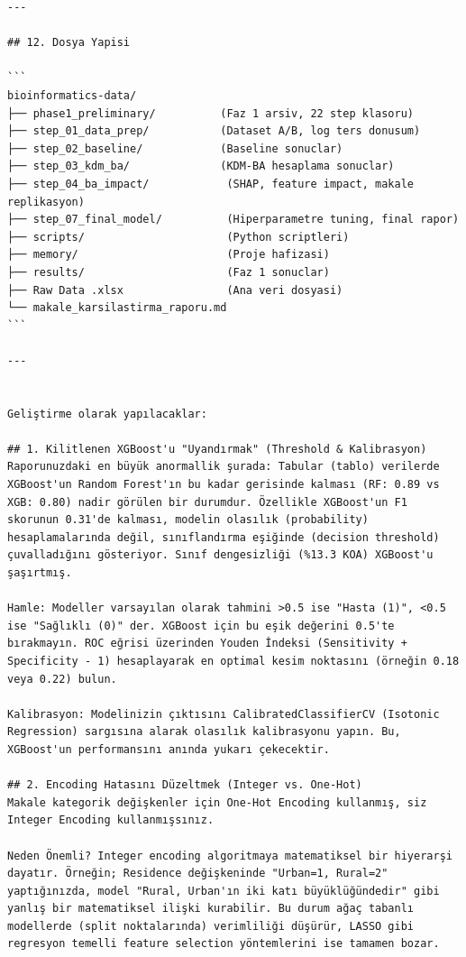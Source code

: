 ﻿\documentclass[11pt,a4paper]{article}
\begin{document}
\begin{verbatim}
---

## 12. Dosya Yapisi

```
bioinformatics-data/
├── phase1_preliminary/          (Faz 1 arsiv, 22 step klasoru)
├── step_01_data_prep/           (Dataset A/B, log ters donusum)
├── step_02_baseline/            (Baseline sonuclar)
├── step_03_kdm_ba/              (KDM-BA hesaplama sonuclar)
├── step_04_ba_impact/            (SHAP, feature impact, makale replikasyon)
├── step_07_final_model/          (Hiperparametre tuning, final rapor)
├── scripts/                      (Python scriptleri)
├── memory/                       (Proje hafizasi)
├── results/                      (Faz 1 sonuclar)
├── Raw Data .xlsx                (Ana veri dosyasi)
└── makale_karsilastirma_raporu.md
```

---


Geliştirme olarak yapılacaklar:

## 1. Kilitlenen XGBoost'u "Uyandırmak" (Threshold & Kalibrasyon)
Raporunuzdaki en büyük anormallik şurada: Tabular (tablo) verilerde XGBoost'un Random Forest'ın bu kadar gerisinde kalması (RF: 0.89 vs XGB: 0.80) nadir görülen bir durumdur. Özellikle XGBoost'un F1 skorunun 0.31'de kalması, modelin olasılık (probability) hesaplamalarında değil, sınıflandırma eşiğinde (decision threshold) çuvalladığını gösteriyor. Sınıf dengesizliği (%13.3 KOA) XGBoost'u şaşırtmış.

Hamle: Modeller varsayılan olarak tahmini >0.5 ise "Hasta (1)", <0.5 ise "Sağlıklı (0)" der. XGBoost için bu eşik değerini 0.5'te bırakmayın. ROC eğrisi üzerinden Youden İndeksi (Sensitivity + Specificity - 1) hesaplayarak en optimal kesim noktasını (örneğin 0.18 veya 0.22) bulun.

Kalibrasyon: Modelinizin çıktısını CalibratedClassifierCV (Isotonic Regression) sargısına alarak olasılık kalibrasyonu yapın. Bu, XGBoost'un performansını anında yukarı çekecektir.

## 2. Encoding Hatasını Düzeltmek (Integer vs. One-Hot)
Makale kategorik değişkenler için One-Hot Encoding kullanmış, siz Integer Encoding kullanmışsınız.

Neden Önemli? Integer encoding algoritmaya matematiksel bir hiyerarşi dayatır. Örneğin; Residence değişkeninde "Urban=1, Rural=2" yaptığınızda, model "Rural, Urban'ın iki katı büyüklüğündedir" gibi yanlış bir matematiksel ilişki kurabilir. Bu durum ağaç tabanlı modellerde (split noktalarında) verimliliği düşürür, LASSO gibi regresyon temelli feature selection yöntemlerini ise tamamen bozar.


\end{verbatim}
\end{document}
